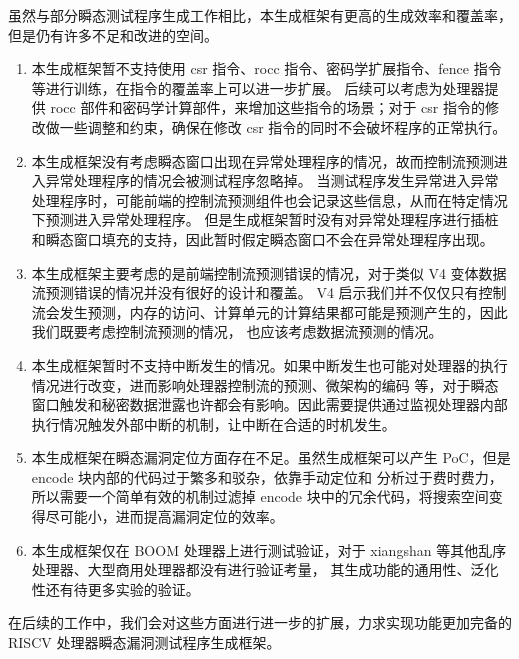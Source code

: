 虽然与部分瞬态测试程序生成工作相比，本生成框架有更高的生成效率和覆盖率，但是仍有许多不足和改进的空间。\par

\begin{enumerate}
    \item 本生成框架暂不支持使用 csr 指令、rocc 指令、密码学扩展指令、fence 指令等进行训练，在指令的覆盖率上可以进一步扩展。
后续可以考虑为处理器提供 rocc 部件和密码学计算部件，来增加这些指令的场景；对于 csr 指令的修改做一些调整和约束，确保在修改 csr
指令的同时不会破坏程序的正常执行。\par
    \item 本生成框架没有考虑瞬态窗口出现在异常处理程序的情况，故而控制流预测进入异常处理程序的情况会被测试程序忽略掉。
当测试程序发生异常进入异常处理程序时，可能前端的控制流预测组件也会记录这些信息，从而在特定情况下预测进入异常处理程序。
但是生成框架暂时没有对异常处理程序进行插桩和瞬态窗口填充的支持，因此暂时假定瞬态窗口不会在异常处理程序出现。\par
    \item 本生成框架主要考虑的是前端控制流预测错误的情况，对于类似 V4 变体数据流预测错误的情况并没有很好的设计和覆盖。
V4 启示我们并不仅仅只有控制流会发生预测，内存的访问、计算单元的计算结果都可能是预测产生的，因此我们既要考虑控制流预测的情况，
也应该考虑数据流预测的情况。\par
    \item 本生成框架暂时不支持中断发生的情况。如果中断发生也可能对处理器的执行情况进行改变，进而影响处理器控制流的预测、微架构的编码
等，对于瞬态窗口触发和秘密数据泄露也许都会有影响。因此需要提供通过监视处理器内部执行情况触发外部中断的机制，让中断在合适的时机发生。\par
    \item 本生成框架在瞬态漏洞定位方面存在不足。虽然生成框架可以产生 PoC，但是 encode 块内部的代码过于繁多和驳杂，依靠手动定位和
分析过于费时费力，所以需要一个简单有效的机制过滤掉 encode 块中的冗余代码，将搜索空间变得尽可能小，进而提高漏洞定位的效率。\par
    \item 本生成框架仅在 BOOM 处理器上进行测试验证，对于 xiangshan 等其他乱序处理器、大型商用处理器都没有进行验证考量，
其生成功能的通用性、泛化性还有待更多实验的验证。\par
\end{enumerate}

在后续的工作中，我们会对这些方面进行进一步的扩展，力求实现功能更加完备的 RISCV 处理器瞬态漏洞测试程序生成框架。\par


